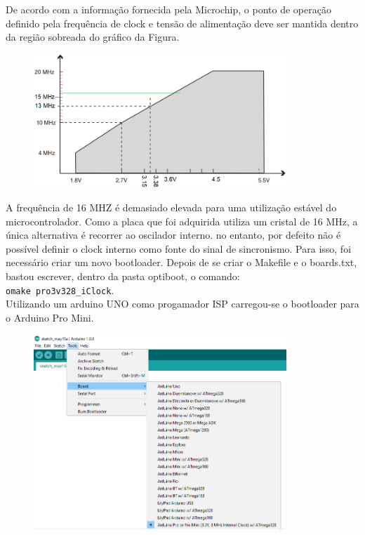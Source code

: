 \documentclass{article}
\begin{document}
De acordo com a informação fornecida pela Microchip, o ponto de operação definido pela frequência de clock e tensão de alimentação deve ser mantida dentro da região sobreada do gráfico da Figura.

\begin{figure}[htb!]
\centering
\includegraphics[width=0.85\textwidth]{Figuras/Fig16.png}
\label{fig:fig15}
\end{figure}

A frequência de 16 MHZ é demasiado elevada para uma utilização estável do microcontrolador. Como a placa que foi adquirida utiliza um cristal de 16 MHz, a única alternativa é recorrer ao oscilador interno. no entanto, por defeito não é possível definir o clock interno como fonte do sinal de sincronismo. Para isso, foi necessário criar um novo bootloader. Depois de se criar o Makefile e o boards.txt, bastou escrever, dentro da pasta optiboot, o comando:\\

\texttt{omake pro3v328\_iClock}.\\

Utilizando um arduino UNO como progamador ISP carregou-se o bootloader para o Arduino Pro Mini.
\begin{figure}[htb!]
\centering
\includegraphics[width=0.85\textwidth]{Figuras/Fig20.png}
\label{fig:fig15}
\end{figure}
\end{document}
